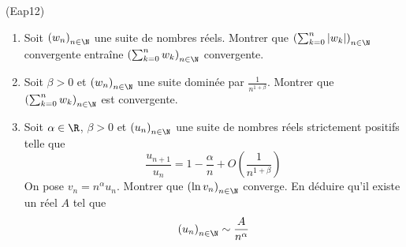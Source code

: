 \begin{tiny}(Eap12)\end{tiny} 
\begin{enumerate}
 \item Soit $\left( w_n\right) _{n\in \N}$ une suite de nombres réels.\newline
Montrer que $\left( \sum_{k=0}^{n}|w_k|\right) _{n\in \N}$ convergente entraîne $\left( \sum_{k=0}^{n}w_k\right) _{n\in \N}$ convergente.
 \item Soit $\beta>0$ et $\left( w_n\right) _{n\in \N}$ une suite dominée par $\frac{1}{n^{1+\beta}}$. Montrer que 
$\left( \sum_{k=0}^{n}w_k\right) _{n\in \N}$ est convergente.
\item Soit $\alpha\in \R$, $\beta>0$ et $\left( u_n\right) _{n\in \N}$ une suite de nombres réels strictement positifs telle que
\begin{displaymath}
 \frac{u_{n+1}}{u_n} = 1 -\frac{\alpha}{n} +O(\frac{1}{n^{1+\beta}})
\end{displaymath}
On pose $v_n=n^\alpha u_n$. Montrer que  $\left( \ln v_n\right) _{n\in \N}$ converge. En déduire qu'il existe un réel $A$ tel que
\begin{displaymath}
 \left( u_n\right) _{n\in \N}\sim \frac{A}{n^\alpha}
\end{displaymath}
 
\end{enumerate}

 